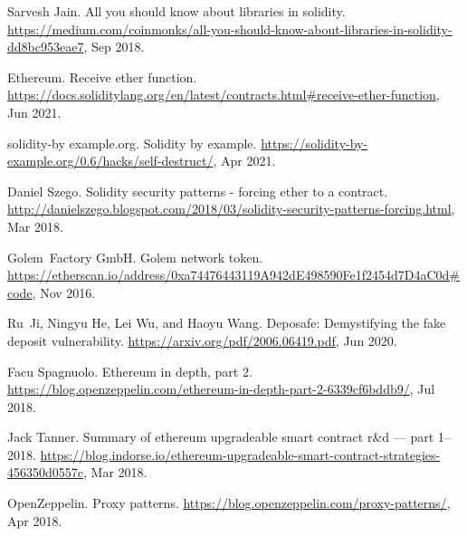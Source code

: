 \begin{thebibliography}{10}
Sarvesh Jain.
\newblock All you should know about libraries in solidity.
\newblock
  \url{https://medium.com/coinmonks/all-you-should-know-about-libraries-in-solidity-dd8bc953eae7},
  Sep 2018.

Ethereum.
\newblock Receive ether function.
\newblock
  \url{https://docs.soliditylang.org/en/latest/contracts.html#receive-ether-function},
  Jun 2021.

solidity-by example.org.
\newblock Solidity by example.
\newblock \url{https://solidity-by-example.org/0.6/hacks/self-destruct/}, Apr
  2021.

Daniel Szego.
\newblock Solidity security patterns - forcing ether to a contract.
\newblock
  \url{http://danielszego.blogspot.com/2018/03/solidity-security-patterns-forcing.html},
  Mar 2018.

Golem~Factory GmbH.
\newblock Golem network token.
\newblock
  \url{https://etherscan.io/address/0xa74476443119A942dE498590Fe1f2454d7D4aC0d#code},
  Nov 2016.

Ru~Ji, Ningyu He, Lei Wu, and Haoyu Wang.
\newblock Deposafe: Demystifying the fake deposit vulnerability.
\newblock \url{https://arxiv.org/pdf/2006.06419.pdf}, Jun 2020.

Facu Spagnuolo.
\newblock Ethereum in depth, part 2.
\newblock
  \url{https://blog.openzeppelin.com/ethereum-in-depth-part-2-6339cf6bddb9/},
  Jul 2018.

Jack Tanner.
\newblock Summary of ethereum upgradeable smart contract r\&d --- part 1--2018.
\newblock
  \url{https://blog.indorse.io/ethereum-upgradeable-smart-contract-strategies-456350d0557c},
  Mar 2018.

OpenZeppelin.
\newblock Proxy patterns.
\newblock \url{https://blog.openzeppelin.com/proxy-patterns/}, Apr 2018.

\end{thebibliography}
